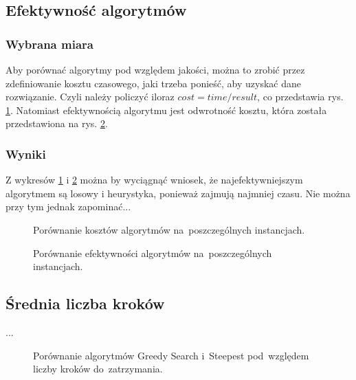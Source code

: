 \subsection{Efektywność algorytmów}

\subsubsection{Wybrana miara}

Aby porównać algorytmy pod względem jakości, można to zrobić przez zdefiniowanie kosztu czasowego, jaki trzeba ponieść, aby uzyskać dane rozwiązanie. Czyli należy policzyć iloraz $cost = time / result$, co przedstawia rys. \ref{fig:cost}. Natomiast efektywnością algorytmu jest odwrotność kosztu, która została przedstawiona na rys. \ref{fig:quality}.

\subsubsection{Wyniki}

Z wykresów \ref{fig:cost} i \ref{fig:quality} można by wyciągnąć wniosek, że najefektywniejszym algorytmem są losowy i heurystyka, ponieważ zajmują najmniej czasu. Nie można przy tym jednak zapominać... %

\begin{figure}
\begin{center}
\end{center}
\caption{Porównanie kosztów algorytmów na~poszczególnych instancjach.}
\label{fig:cost}
\end{figure}

\begin{figure}
\begin{center}
\end{center}
\caption{Porównanie efektywności algorytmów na~poszczególnych instancjach.}
\label{fig:quality}
\end{figure}

\subsection{Średnia liczba kroków}

...

\begin{figure}
\begin{center}
\end{center}
\caption{Porównanie algorytmów Greedy Search i~Steepest pod~względem liczby kroków do~zatrzymania.}
\label{fig:steps}
\end{figure}

